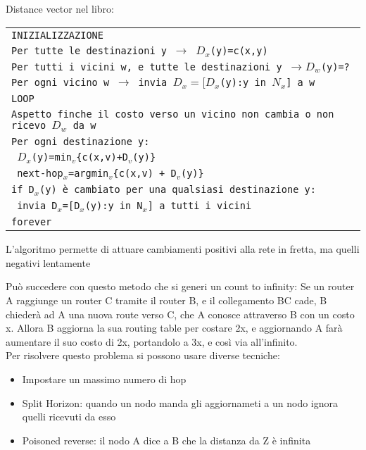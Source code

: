 \documentclass[12pt, a4paper]{article}
\begin{document}
Distance vector nel libro:
\begin{center}
    \begin{tabular}{l}
        \texttt{INIZIALIZZAZIONE}\\
        \texttt{Per tutte le destinazioni y $\to$ $D_{x}$(y)=c(x,y)}\\
        \texttt{Per tutti i vicini w, e tutte le destinazioni y $\to D_{w}$(y)=?}\\
        \texttt{Per ogni vicino w $\to$ invia $D_{x}=[D_{x}$(y):y in $N_{x}$] a w}\\
        \texttt{LOOP}\\
        \texttt{Aspetto finche il costo verso un vicino non cambia o non ricevo $D_{w}$ da w}\\
        \texttt{Per ogni destinazione y:}\\
        \texttt{ $D_{x}$(y)=min$_{v}$\{c(x,v)+D$_{v}$(y)\}}\\
        \texttt{ next-hop$_{x}$=argmin$_{v}$\{c(x,v) + D$_{v}$(y)\}}\\
        \texttt{if D$_{x}$(y) è cambiato per una qualsiasi destinazione y:}\\
        \texttt{ invia D$_{x}$=[D$_{x}$(y):y in N$_{x}$] a tutti i vicini}\\
        \texttt{forever}\\
    \end{tabular}
\end{center}

L'algoritmo permette di attuare cambiamenti positivi alla rete in fretta, ma quelli negativi lentamente

Può succedere con questo metodo che si generi un count to infinity: Se un router A raggiunge un router 
C tramite il router B, e il collegamento BC cade, B chiederà ad A una nuova route verso C, che A 
conosce attraverso B con un costo x. Allora B aggiorna la sua routing table per costare 2x, e 
aggiornando A farà aumentare il suo costo di 2x, portandolo a 3x, e così via all'infinito.\\
Per risolvere questo problema si possono usare diverse tecniche:
\begin{itemize}
    \item Impostare un massimo numero di hop
    \item Split Horizon: quando un nodo manda gli aggiornameti a un nodo ignora quelli ricevuti da esso
    \item Poisoned reverse: il nodo A dice a B che la distanza da Z è infinita
\end{itemize}
\end{document}
